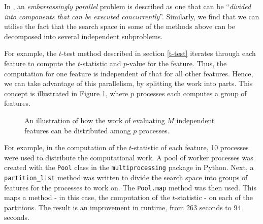 \documentclass[12pt, twoside, a4paper]{report}
\begin{document}
In \cite{RefWorks:221}, an \textit{embarrassingly parallel} problem is described as one that can be ``\textit{divided into components that can be executed concurrently}''. Similarly, we find that we can utilise the fact that the search space in some of the methods above can be decomposed into several independent subproblems.

For example, the $t$-test method described in section \ref{t-test} iterates through each feature to compute the $t$-statistic and $p$-value for the feature. Thus, the computation for one feature is independent of that for all other features. Hence, we can take advantage of this parallelism, by splitting the work into parts. This concept is illustrated in Figure \ref{body:parallelism_diag}, where $p$ processes each computes a group of features.

\begin{figure}
\centering
{}
\caption{An illustration of how the work of evaluating $M$ independent features can be distributed among $p$ processes.}
\label{body:parallelism_diag}
\end{figure}


For example, in the computation of the $t$-statistic of each feature, 10 processes were used to distribute the computational work. A pool of worker processes was created with the \texttt{Pool} class in the \texttt{multiprocessing} package in Python. Next, a \texttt{partition\_list} method was written to divide the search space into groups of features for the processes to work on. The \texttt{Pool.map} method was then used. This maps a method - in this case, the computation of the $t$-statistic - on each of the partitions. The result is an improvement in runtime, from 263 seconds to 94 seconds.
\end{document}
